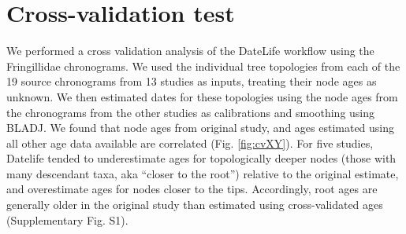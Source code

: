 \documentclass[english,man]{apa6}
\begin{document}
\hypertarget{cross-validation-test}{%
\section{Cross-validation test}\label{cross-validation-test}}

We performed a cross validation analysis of the DateLife workflow using the Fringillidae chronograms.
We used the individual tree topologies from each of the 19 source chronograms from 13 studies as inputs, treating their node ages as unknown.
We then estimated dates for these topologies using the node ages from the chronograms from the other studies as calibrations and smoothing using BLADJ.
We found that node ages from original study, and ages estimated using all other age data available are correlated (Fig. \ref{fig:cvXY}).
For five studies, Datelife tended to underestimate ages for topologically deeper nodes (those with many descendant taxa, aka \enquote{closer to the root}) relative to the original estimate, and overestimate ages for nodes closer to the tips.
Accordingly, root ages are generally older in the original study than estimated using cross-validated ages (Supplementary Fig. S1).

\newpage
\end{document}
